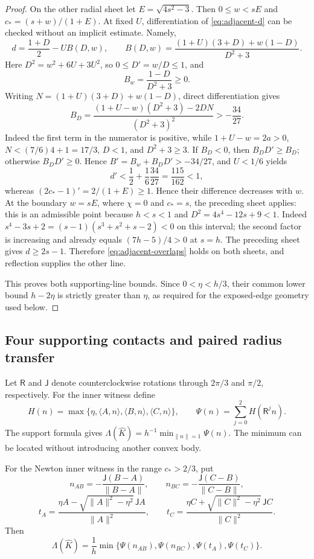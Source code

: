 \begin{proof}
On the other radial sheet let $E=\sqrt{4s^2-3}$.  Then
$0\le w<sE$ and $c_*=(s+w)/(1+E)$.  At fixed $U$, differentiation of
\eqref{eq:adjacent-d} can be checked without an implicit estimate.  Namely,
\[
 d=\frac{1+D}{2}-UB(D,w),\qquad
 B(D,w)=\frac{(1+U)(3+D)+w(1-D)}{D^2+3}.
\]
Here $D^2=w^2+6U+3U^2$, so $0\le D'=w/D\le1$, and
\[
 B_w=\frac{1-D}{D^2+3}\ge0.
\]
Writing $N=(1+U)(3+D)+w(1-D)$, direct differentiation gives
\[
 B_D=\frac{(1+U-w)(D^2+3)-2DN}{(D^2+3)^2}>-\frac{34}{27}.
\]
Indeed the first term in the numerator is positive, while
$1+U-w=2a>0$, $N<(7/6)4+1=17/3$, $D<1$, and $D^2+3\ge3$.  If $B_D<0$, then
$B_DD'\ge B_D$; otherwise $B_DD'\ge0$.  Hence
$B'=B_w+B_DD'>-34/27$, and $U<1/6$ yields
\[
 d'<\frac12+\frac16\frac{34}{27}=\frac{115}{162}<1,
\]
whereas
$(2c_*-1)'=2/(1+E)\ge1$.  Hence their difference decreases with $w$.
At the boundary $w=sE$, where $\chi=0$ and $c_*=s$, the preceding sheet
applies: this is an admissible point because $h<s<1$ and
$D^2=4s^4-12s+9<1$.  Indeed
$s^4-3s+2=(s-1)(s^3+s^2+s-2)<0$ on this interval; the second factor is
increasing and already equals $(7h-5)/4>0$ at $s=h$.  The preceding sheet gives
$d\ge2s-1$.  Therefore \eqref{eq:adjacent-overlaps} holds on both
sheets, and reflection supplies the other line.

This proves both supporting-line bounds. Since $0<\eta<h/3$, their
common lower bound $h-2\eta$ is strictly greater than $\eta$, as required
for the exposed-edge geometry used below.
\end{proof}


\subsection{Four supporting contacts and paired radius transfer}
\label{subsec:nine-point-conclusion}

Let $\mathsf R$ and $\mathsf J$ denote counterclockwise rotations through
$2\pi/3$ and $\pi/2$, respectively. For the inner witness define
\[
 H(n)=\max\{\eta,\langle A,n\rangle,\langle B,n\rangle,
                  \langle C,n\rangle\},
 \qquad \Psi(n)=\sum_{j=0}^2H(\mathsf R^jn).
\]
The support formula gives
$\Lambda(\widehat K)=h^{-1}\min_{\|n\|=1}\Psi(n)$.
The minimum can be located without introducing another convex body.

\begin{lemma}
\label{lem:four-contact-formula}
For the Newton inner witness in the range $c_*>2/3$, put
\[
 n_{AB}=-\frac{\mathsf J(B-A)}{\|B-A\|},\qquad
 n_{BC}=-\frac{\mathsf J(C-B)}{\|C-B\|},
\]
\[
 t_A=\frac{\eta A-\sqrt{\|A\|^2-\eta^2}\,\mathsf JA}{\|A\|^2},
 \qquad
 t_C=\frac{\eta C+\sqrt{\|C\|^2-\eta^2}\,\mathsf JC}{\|C\|^2}.
\]
Then
\begin{equation}
 \Lambda(\widehat K)=\frac1h
 \min\{\Psi(n_{AB}),\Psi(n_{BC}),\Psi(t_A),\Psi(t_C)\}.
 \label{eq:four-contact-minimum}
\end{equation}
\end{lemma}

